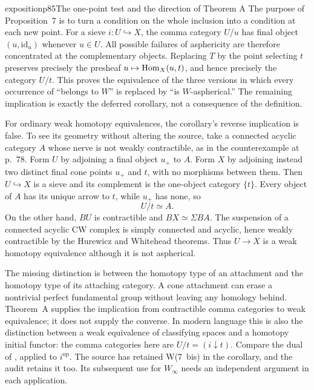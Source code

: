 \begin{dcomment}{exposition}{p85}{The one-point test and the direction of Theorem A}
The purpose of Proposition~7 is to turn a condition on the whole inclusion into a condition at each new point. For a sieve $i:U\hookrightarrow X$, the comma category $U/u$ has final object $(u,\mathrm{id}_u)$ whenever $u\in U$. All possible failures of asphericity are therefore concentrated at the complementary objects. Replacing $T$ by the point selecting $t$ preserves precisely the presheaf $u\mapsto\mathrm{Hom}_X(u,t)$, and hence precisely the category $U/t$. This proves the equivalence of the three versions in which every occurrence of ``belongs to $W$'' is replaced by ``is $W$-aspherical.'' The remaining implication is exactly the deferred corollary, not a consequence of the definition.

For ordinary weak homotopy equivalences, the corollary's reverse implication is false. To see its geometry without altering the source, take a connected acyclic category $A$ whose nerve is not weakly contractible, as in the counterexample at p.~78. Form $U$ by adjoining a final object $u_+$ to $A$. Form $X$ by adjoining instead two distinct final cone points $u_+$ and $t$, with no morphisms between them. Then $U\hookrightarrow X$ is a sieve and its complement is the one-object category $\{t\}$. Every object of $A$ has its unique arrow to $t$, while $u_+$ has none, so
\[
U/t\simeq A.
\]
On the other hand, $BU$ is contractible and $BX\simeq\Sigma BA$. The suspension of a connected acyclic CW complex is simply connected and acyclic, hence weakly contractible by the Hurewicz and Whitehead theorems. Thus $U\to X$ is a weak homotopy equivalence although it is not aspherical.

The missing distinction is between the homotopy type of an attachment and the homotopy type of its attaching category. A cone attachment can erase a nontrivial perfect fundamental group without leaving any homology behind. Theorem~A supplies the implication from contractible comma categories to weak equivalence; it does not supply the converse. In modern language this is also the distinction between a weak equivalence of classifying spaces and a homotopy initial functor: the comma categories here are $U/t=(i\downarrow t)$. Compare the dual of \citet[Theorem~4.1.3.1 and Corollary~4.1.3.3]{Lurie2009HTT}, applied to $i^{\mathrm{op}}$. The source has retained W(7~bis) in the corollary, and the audit retains it too. Its subsequent use for $W_\infty$ needs an independent argument in each application.
\end{dcomment}



